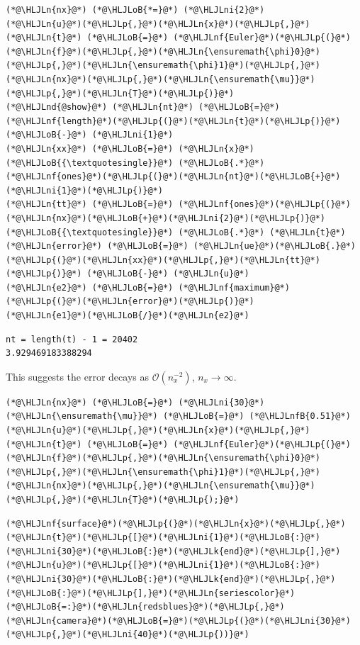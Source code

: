 \documentclass[12pt,a4paper]{article}
\newcommand{\HLJLk}[1]{\textcolor[RGB]{148,91,176}{\textbf{#1}}}
\newcommand{\HLJLn}[1]{#1}
\newcommand{\HLJLnd}[1]{\textcolor[RGB]{214,102,97}{#1}}
\newcommand{\HLJLnf}[1]{\textcolor[RGB]{66,102,213}{#1}}
\newcommand{\HLJLnfB}[1]{\textcolor[RGB]{59,151,46}{#1}}
\newcommand{\HLJLni}[1]{\textcolor[RGB]{59,151,46}{#1}}
\newcommand{\HLJLoB}[1]{\textcolor[RGB]{102,102,102}{\textbf{#1}}}
\newcommand{\HLJLp}[1]{#1}
\begin{document}
\begin{lstlisting}
(*@\HLJLn{nx}@*) (*@\HLJLoB{*=}@*) (*@\HLJLni{2}@*)
(*@\HLJLn{u}@*)(*@\HLJLp{,}@*)(*@\HLJLn{x}@*)(*@\HLJLp{,}@*)(*@\HLJLn{t}@*) (*@\HLJLoB{=}@*) (*@\HLJLnf{Euler}@*)(*@\HLJLp{(}@*)(*@\HLJLn{f}@*)(*@\HLJLp{,}@*)(*@\HLJLn{\ensuremath{\phi}0}@*)(*@\HLJLp{,}@*)(*@\HLJLn{\ensuremath{\phi}1}@*)(*@\HLJLp{,}@*)(*@\HLJLn{nx}@*)(*@\HLJLp{,}@*)(*@\HLJLn{\ensuremath{\mu}}@*)(*@\HLJLp{,}@*)(*@\HLJLn{T}@*)(*@\HLJLp{)}@*)
(*@\HLJLnd{@show}@*) (*@\HLJLn{nt}@*) (*@\HLJLoB{=}@*) (*@\HLJLnf{length}@*)(*@\HLJLp{(}@*)(*@\HLJLn{t}@*)(*@\HLJLp{)}@*) (*@\HLJLoB{-}@*) (*@\HLJLni{1}@*)
(*@\HLJLn{xx}@*) (*@\HLJLoB{=}@*) (*@\HLJLn{x}@*)(*@\HLJLoB{{\textquotesingle}}@*) (*@\HLJLoB{.*}@*) (*@\HLJLnf{ones}@*)(*@\HLJLp{(}@*)(*@\HLJLn{nt}@*)(*@\HLJLoB{+}@*)(*@\HLJLni{1}@*)(*@\HLJLp{)}@*)
(*@\HLJLn{tt}@*) (*@\HLJLoB{=}@*) (*@\HLJLnf{ones}@*)(*@\HLJLp{(}@*)(*@\HLJLn{nx}@*)(*@\HLJLoB{+}@*)(*@\HLJLni{2}@*)(*@\HLJLp{)}@*)(*@\HLJLoB{{\textquotesingle}}@*) (*@\HLJLoB{.*}@*) (*@\HLJLn{t}@*)
(*@\HLJLn{error}@*) (*@\HLJLoB{=}@*) (*@\HLJLn{ue}@*)(*@\HLJLoB{.}@*)(*@\HLJLp{(}@*)(*@\HLJLn{xx}@*)(*@\HLJLp{,}@*)(*@\HLJLn{tt}@*)(*@\HLJLp{)}@*) (*@\HLJLoB{-}@*) (*@\HLJLn{u}@*)
(*@\HLJLn{e2}@*) (*@\HLJLoB{=}@*) (*@\HLJLnf{maximum}@*)(*@\HLJLp{(}@*)(*@\HLJLn{error}@*)(*@\HLJLp{)}@*)
(*@\HLJLn{e1}@*)(*@\HLJLoB{/}@*)(*@\HLJLn{e2}@*)
\end{lstlisting}

\begin{lstlisting}
nt = length(t) - 1 = 20402
3.929469183388294
\end{lstlisting}


This suggests the error decays as $\mathcal{O}(n_x^{-2})$, $n_x \to \infty$.


\begin{lstlisting}
(*@\HLJLn{nx}@*) (*@\HLJLoB{=}@*) (*@\HLJLni{30}@*)
(*@\HLJLn{\ensuremath{\mu}}@*) (*@\HLJLoB{=}@*) (*@\HLJLnfB{0.51}@*)
(*@\HLJLn{u}@*)(*@\HLJLp{,}@*)(*@\HLJLn{x}@*)(*@\HLJLp{,}@*)(*@\HLJLn{t}@*) (*@\HLJLoB{=}@*) (*@\HLJLnf{Euler}@*)(*@\HLJLp{(}@*)(*@\HLJLn{f}@*)(*@\HLJLp{,}@*)(*@\HLJLn{\ensuremath{\phi}0}@*)(*@\HLJLp{,}@*)(*@\HLJLn{\ensuremath{\phi}1}@*)(*@\HLJLp{,}@*)(*@\HLJLn{nx}@*)(*@\HLJLp{,}@*)(*@\HLJLn{\ensuremath{\mu}}@*)(*@\HLJLp{,}@*)(*@\HLJLn{T}@*)(*@\HLJLp{);}@*)
\end{lstlisting}


\begin{lstlisting}
(*@\HLJLnf{surface}@*)(*@\HLJLp{(}@*)(*@\HLJLn{x}@*)(*@\HLJLp{,}@*)(*@\HLJLn{t}@*)(*@\HLJLp{[}@*)(*@\HLJLni{1}@*)(*@\HLJLoB{:}@*)(*@\HLJLni{30}@*)(*@\HLJLoB{:}@*)(*@\HLJLk{end}@*)(*@\HLJLp{],}@*)(*@\HLJLn{u}@*)(*@\HLJLp{[}@*)(*@\HLJLni{1}@*)(*@\HLJLoB{:}@*)(*@\HLJLni{30}@*)(*@\HLJLoB{:}@*)(*@\HLJLk{end}@*)(*@\HLJLp{,}@*)(*@\HLJLoB{:}@*)(*@\HLJLp{],}@*)(*@\HLJLn{seriescolor}@*)(*@\HLJLoB{=:}@*)(*@\HLJLn{redsblues}@*)(*@\HLJLp{,}@*) (*@\HLJLn{camera}@*)(*@\HLJLoB{=}@*)(*@\HLJLp{(}@*)(*@\HLJLni{30}@*)(*@\HLJLp{,}@*)(*@\HLJLni{40}@*)(*@\HLJLp{))}@*)
\end{lstlisting}
\end{document}
